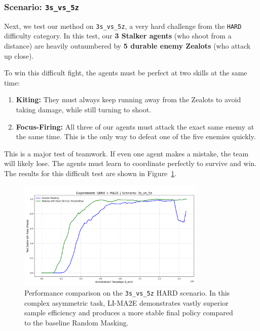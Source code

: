 
\subsubsection{Scenario: \texttt{3s\_vs\_5z}}

Next, we test our method on \texttt{3s\_vs\_5z}, a very hard challenge from the \texttt{HARD} difficulty category. In this test, our \textbf{3 Stalker agents} (who shoot from a distance) are heavily outnumbered by \textbf{5 durable enemy Zealots} (who attack up close).

To win this difficult fight, the agents must be perfect at two skills at the same time:
\begin{enumerate}
    \item \textbf{Kiting:} They must always keep running away from the Zealots to avoid taking damage, while still turning to shoot.
    \item \textbf{Focus-Firing:} All three of our agents must attack the exact same enemy at the same time. This is the only way to defeat one of the five enemies quickly.
\end{enumerate}
This is a major test of teamwork. If even one agent makes a mistake, the team will likely lose. The agents must learn to coordinate perfectly to survive and win. The results for this difficult test are shown in Figure~\ref{fig:3s_vs_5z}.

\begin{figure}[H]
    \centering
    \includegraphics[width=0.8\textwidth]{images_pfe/results_li-ma2e/test_battle_won_mean_3s_vs_5z_Mean_TD-Error_Thresholding _smoothed.png}
    \caption{Performance comparison on the \texttt{3s\_vs\_5z} HARD scenario. In this complex asymmetric task, LI-MA2E demonstrates vastly superior sample efficiency and produces a more stable final policy compared to the baseline Random Masking.}
    \label{fig:3s_vs_5z}
\end{figure}

